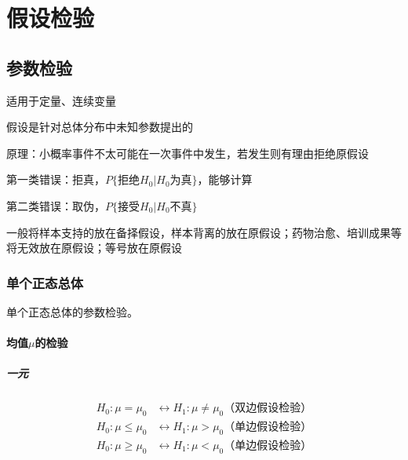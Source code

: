 \documentclass[12pt]{book}
\begin{document}
\chapter{假设检验}





\section{参数检验}

适用于定量、连续变量

假设是针对总体分布中未知参数提出的

原理：小概率事件不太可能在一次事件中发生，若发生则有理由拒绝原假设

第一类错误：拒真，$P\{拒绝H_0|H_0为真\}$，能够计算

第二类错误：取伪，$P\{接受H_0|H_0不真\}$

一般将样本支持的放在备择假设，样本背离的放在原假设；药物治愈、培训成果等将无效放在原假设；等号放在原假设




\subsection{单个正态总体}





单个正态总体的参数检验。


\subsubsection{均值$\mu$的检验}

\paragraph{一元}

\begin{align*}
    H_0: \mu = \mu_0    & \leftrightarrow  	H_1: \mu \neq  \mu_0 \text{（双边假设检验）} \\
    H_0: \mu \leq \mu_0 & \leftrightarrow  	H_1: \mu > \mu_0 \text{（单边假设检验）}     \\
    H_0: \mu \geq \mu_0 & \leftrightarrow  	H_1: \mu < \mu_0 \text{（单边假设检验）}
\end{align*}
\end{document}
